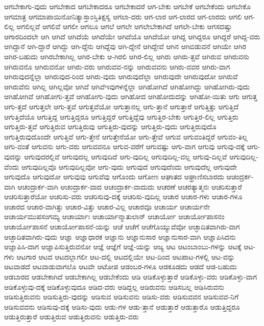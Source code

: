 {ಆಗಬೇಕಾಗು-ವುದು
ಆಗಬೇಕಾದ
ಆಗಬೇಕಾದರೂ
ಆಗಬೇಕಾದರೆ
ಆಗ-ಬೇಕು
ಆಗಬೇಕೆ
ಆಗಬೇಕೆಂದು
ಆಗಬೇಕೊ
ಆಗಮಾತ್ರ
ಆಗಮಾಪಾಯಿನೋನಿತ್ಯಾಸ್ತಾಂಸ್ತಿತಿಕ್ಷಸ್ವ
ಆಗಲಾ-ದರು
ಆಗ-ಲಾರ
ಆಗ-ಲಾರದ
ಆಗ-ಲಾರದು
ಆಗಲಿ
ಆಗ-ಲಿಲ್ಲ
ಆಗಲಿಲ್ಲವೆ
ಆಗಲಿವೆ
ಆಗಲೀ
ಆಗಲೂ
ಆಗಲೆ
ಆಗಲೇ
ಆಗಲೇಬೇಕಾಗಿದೆ
ಆಗಲೇ-ಬೇಕು
ಆಗಸದಷ್ಚು
ಆಗಾರದಿಂದಲೇ
ಆಗಿ
ಆಗಿದೆ
ಆಗಿದೆಯೆ
ಆಗಿದೆಯೇ
ಆಗಿದೆಯೊ
ಆಗಿದೆಯೋ
ಆಗಿದ್ದ
ಆಗಿದ್ದರೂ
ಆಗಿದ್ದರೆ
ಆಗಿದ್ದ-ವರು
ಆಗಿದ್ದಾನೆ
ಆಗಿ-ದ್ದಾರೆ
ಆಗಿದ್ದು
ಆಗಿ-ದ್ದೆನು
ಆಗಿದ್ದೆವು
ಆಗಿ-ದ್ದೇನೆ
ಆಗಿದ್ದೇವೆ
ಆಗಿನ
ಆಗಿಬಿಡುವನೆ
ಆಗಿಯೇ
ಆಗಿರ
ಆಗಿರ-ಬಹುದು
ಆಗಿರಬೇಕಾಗಿಲ್ಲ
ಆಗಿರ-ಬೇಕು
ಆ-ಗಿರಲಿ
ಆಗಿರ-ಲಿಲ್ಲ
ಆಗಿರು
ಆಗಿರು-ತ್ತವೆ
ಆಗಿರುವ
ಆಗಿರುವನು
ಆಗಿರುವನೊ
ಆಗಿರುವನೋ
ಆಗಿರು-ವರು
ಆಗಿರುವವ-ನನ್ನು
ಆಗಿರುವವನು
ಆಗಿರು-ವವರ
ಆಗಿರು-ವಾಗ
ಆಗಿರುವುದನ್ನೆಲ್ಲಾ
ಆಗಿರುವುದ-ರಿಂದ
ಆಗಿರು-ವುದು
ಆಗಿರುವುದೆಲ್ಲಾ
ಆಗಿರುವುದೇ
ಆಗಿರುವುದೋ
ಆಗಿರುವೆ
ಆಗಿರುವೆನು
ಆಗಿಲ್ಲ
ಆಗಿಲ್ಲವೋ
ಆಗಿವೆ
ಆಗಿವೆಇವುಗಳನ್ನೆಲ್ಲಾ
ಆಗಿಹೋಗಿದೆ
ಆಗಿಹೋಗಿದ್ದು
ಆಗಿಹೋಗಿರು-ವುದು
ಆಗಿಹೋಗಿವೆ
ಆಗಿಹೋಗು-ತ್ತವೆ
ಆಗಿಹೋಗು-ವುದು
ಆಗಿಹೋದ
ಆಗಿಹೋದುದನ್ನು
ಆಗಿಹೋ-ಯಿತು
ಆಗು
ಆಗುತ್ತ
ಆಗು-ತ್ತದೆ
ಆಗುತ್ತಲೇ
ಆಗು-ತ್ತವೆ
ಆಗುತ್ತವೆಯೋ
ಆಗುತ್ತಾನಲ್ಲ
ಆಗು-ತ್ತಾನೆ
ಆಗುತ್ತಾರೆ
ಆಗುತ್ತಿತ್ತು
ಆಗುತ್ತಿದೆ
ಆಗುತ್ತಿದೆಯೊ
ಆಗುತ್ತಿದ್ದ
ಆಗುತ್ತಿದ್ದರೂ
ಆಗುತ್ತಿದ್ದರೆ
ಆಗುತ್ತಿದ್ದೆವು
ಆಗುತ್ತಿರ-ಬೇಕು
ಆಗುತ್ತಿರ-ಲಿಲ್ಲ
ಆಗುತ್ತಿರು
ಆಗುತ್ತಿರು-ತ್ತವೆ
ಆಗುತ್ತಿರುವ
ಆಗುತ್ತಿರುವು
ಆಗುತ್ತಿರು-ವುದನ್ನು
ಆಗುತ್ತಿರು-ವುದು
ಆಗುತ್ತಿರುವುದೊ
ಆಗುತ್ತಿರುವುದೊಂದೇ
ಆಗುತ್ತಿವೆ
ಆಗು-ತ್ತೇನೆ
ಆಗುತ್ತೇನೆಯೋ
ಆಗು-ತ್ತೇವೆ
ಆಗುವ
ಆಗುವಂತಿದ್ದರೆ
ಆಗುವಂ-ತಿಲ್ಲ
ಆಗು-ವಂತೆ
ಆಗುವನು
ಆಗು-ವರು
ಆಗುವವನೂ
ಆಗುವ-ವರೆಗೆ
ಆಗುವಷ್ಟು
ಆಗು-ವಾಗ
ಆಗುವು
ಆಗುವು-ದಕ್ಕೆ
ಆಗು-ವುದನ್ನು
ಆಗುವುದರಲ್ಲಿವೆ
ಆಗುವುದಲ್ಲ
ಆಗುವುದಿದೆ
ಆಗು-ವುದಿಲ್ಲ
ಆಗುವುದಿಲ್ಲ-ವಲ್ಲ
ಆಗುವು-ದಿಲ್ಲವೆ
ಆಗುವುದಿಲ್ಲ-ವೆಂದು
ಆಗುವುದಿಲ್ಲವೊ
ಆಗುವುದಿಲ್ಲವೋ
ಆಗು-ವುದು
ಆಗುವುದೆ
ಆಗುವುದೆಂದು
ಆಗುವುದೆಲ್ಲ
ಆಗುವುದೇ
ಆಗುವುದೊ
ಆಗುವುದೋ
ಆಗುವುವು
ಆಗುವೆವು
ಆಗೊಂದು
ಆಗೋಣ
ಆಘಾತದ
ಆಘ್ರಾಣಿಸಬಾರದು
ಆಚಂದ್ರರ್ಕ-ವಾಗಿ
ಆಚಂದ್ರಾರ್ಕ-ವಾಗಿ
ಆಚಂದ್ರಾರ್ಕ-ವಾದ
ಆಚಂದ್ರಾರ್ಕ-ವಾದುದು
ಆಚರಣೆ
ಆಚರತ್ಯಾತ್ಮನಃ
ಆಚರಿಸುತ್ತಾರೆ
ಆಚರಿಸುತ್ತಾರೆಯೋ
ಆಚರಿಸು-ವರು
ಆಚರಿಸುವು-ದಕ್ಕೆ
ಆಚರಿಸು-ವುದಿಲ್ಲ
ಆಚಾರ
ಆಚಾರ-ಗಳು
ಆಚಾರ-ಗಳೂ
ಆಚಾರದ
ಆಚಾರ-ವಾಗಿತ್ತು
ಆಚಾರ-ವಿತ್ತು
ಆಚಾರ-ವಿಲ್ಲ
ಆಚಾರವೂ
ಆಚಾರ್ಯ
ಆಚಾರ್ಯನೇ
ಆಚಾರ್ಯಮುಪಸಂಗಮ್ಯ
ಆಚಾರ್ಯಾಃ
ಆಚಾರ್ಯಾನ್ಮಾತುಲಾನ್
ಆಚಾರ್ಯೋ
ಆಚಾರ್ಯೋಪಾಸನಂ
ಆಚಾರ್ಯೋಪಾಸನೆ
ಆಚಾರ್ಯೋಪಾಸನೆ-ಯನ್ನು
ಆಚೆ
ಆಚೆಗೆ
ಆಚೆಗೊಯ್ಯುವೆವೋ
ಆಚ್ಛಾದಿತವಾಗಿರು-ವಾಗ
ಆಚ್ಛಾದಿತವಾಗಿರು-ವುದು
ಆಜ್ಞಾ
ಆಜ್ಞಾಧಾರಕ
ಆಜ್ಞಾನು
ಆಜ್ಞಾನುಸಾರ
ಆಜ್ಞಾನುಸಾರ-ವಾಗಿ
ಆಜ್ಞಾಪಿಸಿದನು
ಆಜ್ಞಾಪಿಸಿ-ದಾಗ
ಆಜ್ಞಾಪಿಸುತ್ತಿರುವನೋ
ಆಜ್ಞೆ
ಆಜ್ಞೆಗೆ
ಆಜ್ಞೆ-ಯನ್ನು
ಆಜ್ಯ
ಆಟ
ಆಟಂಬಾಂಬು-ಗಳನ್ನು
ಆಟಕ್ಕೆ
ಆಟ-ಗಳು
ಆಟಗಾರ
ಆಟದ
ಆಟದಲ್ಲಾಗಲೀ
ಆಟ-ದಲ್ಲಿ
ಆಟದಲ್ಲಿಯೇ
ಆಟ-ದಿಂದ
ಆಟಪಾಟ-ಗಳಲ್ಲಿ
ಆಟ-ವನ್ನು
ಆಟವಾಡದೆ
ಆಟವಾಡುವಾಗಲೊ
ಆಟವೇ
ಆಟೋಪ
ಆಡಂಬರ-ಗಳೂ
ಆಡಕೂಡದು
ಆಡದೆ
ಆಡ-ಬಹುದು
ಆಡಬಾರದ
ಆಡಬೇಕಾಗಿದೆ
ಆಡಬೇಕಾಗಿಲ್ಲ
ಆಡಬೇಕೆಂದು
ಆಡಿ
ಆಡಿಕೊಳ್ಳುತ್ತಾರೆ
ಆಡಿಕೊಳ್ಳು-ವರು
ಆಡಿಕೊಳ್ಳು-ವಾಗ
ಆಡಿಕೊಳ್ಳುವು-ದಕ್ಕೆ
ಆಡಿಕೊಳ್ಳುವುದೂ
ಆಡಿದ-ವರು
ಆಡಿದ್ದಲ್ಲ
ಆಡಿರುವನು
ಆಡಿಸಬಲ್ಲ
ಆಡಿಸಿರುವನು
ಆಡಿಸುತ್ತಿರುವನು
ಆಡಿಸುತ್ತಿರು-ವುದನ್ನು
ಆಡಿಸುವ
ಆಡಿಸುವನು
ಆಡಿಸು-ವರು
ಆಡಿಸುವವನ
ಆಡಿಸುವವ-ನಿಗೆ
ಆಡಿಸುವವನು
ಆಡಿಸುವು-ದಕ್ಕೆ
ಆಡಿಸು-ವುದು
ಆಡು-ಗಳ
ಆಡು-ತ್ತಾನೆ
ಆಡುತ್ತಾರೆ
ಆಡುತ್ತಾರೊ
ಆಡುತ್ತಿದ್ದರೂ
ಆಡುತ್ತಿರುತ್ತಾರೆ
ಆಡುತ್ತಿರುವ
ಆಡುತ್ತಿರುವನು
ಆಡುತ್ತಿರು-ವರು
}
